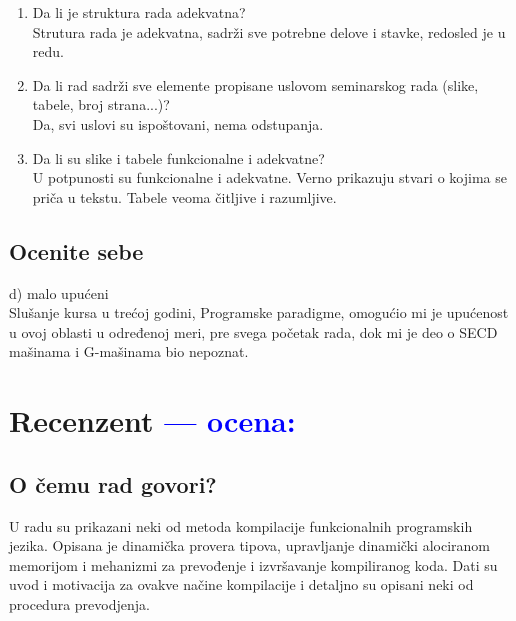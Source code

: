 \documentclass[a4paper]{report}
\newcommand{\odgovor}[1]{\textcolor{blue}{#1}}
\begin{document}
\begin{enumerate}
\item Da li je struktura rada adekvatna?\\
Strutura rada je adekvatna, sadrži sve potrebne delove i stavke, redosled je u redu.
\item Da li rad sadrži sve elemente propisane uslovom seminarskog rada (slike, tabele, broj strana...)?\\
Da, svi uslovi su ispoštovani, nema odstupanja.
\item Da li su slike i tabele funkcionalne i adekvatne? \\
U potpunosti su funkcionalne i adekvatne. Verno prikazuju stvari o kojima se priča u tekstu. Tabele veoma čitljive i razumljive.
\end{enumerate}

\section{Ocenite sebe}
 d) malo upućeni  \\ 
Slušanje kursa u trećoj godini, Programske paradigme, omogućio mi je upućenost u ovoj oblasti u određenoj meri, pre svega početak rada, dok mi je deo o SECD mašinama i G-mašinama bio nepoznat.


\chapter{Recenzent \odgovor{--- ocena:} }


\section{O čemu rad govori?}
U radu su prikazani neki od metoda kompilacije funkcionalnih programskih jezika.
Opisana je dinamička provera tipova, upravljanje dinamički alociranom memorijom i mehanizmi za prevođenje i izvršavanje kompiliranog koda. Dati su uvod i motivacija za ovakve načine kompilacije i detaljno su opisani neki od procedura prevodjenja.
\end{document}
